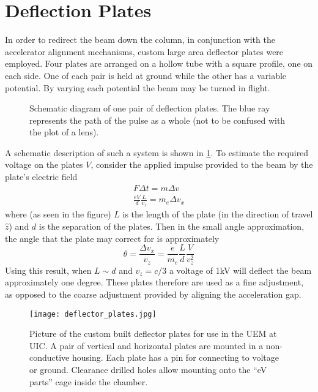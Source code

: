 
\section{Deflection Plates}

In order to redirect the beam down the column, in conjunction with the accelerator alignment mechanisms, custom large area deflector plates were employed.
Four plates are arranged on a hollow tube with a square profile, one on each side.
One of each pair is held at ground while the other has a variable potential.
By varying each potential the beam may be turned in flight.

\begin{figure}
  \centering
  
  \caption[Schematic diagram of one pair of deflection plates]{
    Schematic diagram of one pair of deflection plates.
    The blue ray represents the path of the pulse as a whole (not to be confused with the plot of a lens).
  }
  \label{fig:deflector_schematic}
\end{figure}

A schematic description of such a system is shown in \ref{fig:deflector_schematic}.
To estimate the required voltage on the plates $V$, consider the applied impulse provided to the beam by the plate's electric field
\begin{gather}
  F \Delta t = m \Delta v \\
  \frac{ e V }{ d } \frac{ L }{ v_z } = m_e \Delta v_x
\end{gather}
where (as seen in the figure) $L$ is the length of the plate (in the direction of travel $\hat{z}$) and $d$ is the separation of the plates.
Then in the small angle approximation, the angle that the plate may correct for is approximately
\begin{equation}
  \theta = \frac{ \Delta v_x }{ v_z } = \frac{ e }{ m_e } \frac{ L }{ d } \frac{ V }{ v_z^2 }
\end{equation}
Using this result, when $L \sim d$ and $v_z = c/3$ a voltage of 1kV will deflect the beam approximately one degree.
These plates therefore are used as a fine adjustment, as opposed to the coarse adjustment provided by aligning the acceleration gap.

\begin{figure}
  \centering
  \texttt{[image: deflector\_plates.jpg]}
  \caption[Picture of custom deflector plates]{
    Picture of the custom built deflector plates for use in the UEM at UIC.
    A pair of vertical and horizontal plates are mounted in a non-conductive housing.
    Each plate has a pin for connecting to voltage or ground.
    Clearance drilled holes allow mounting onto the ``eV parts'' cage inside the chamber.
  }
  \label{fig:deflector-plates-pic}
\end{figure}
